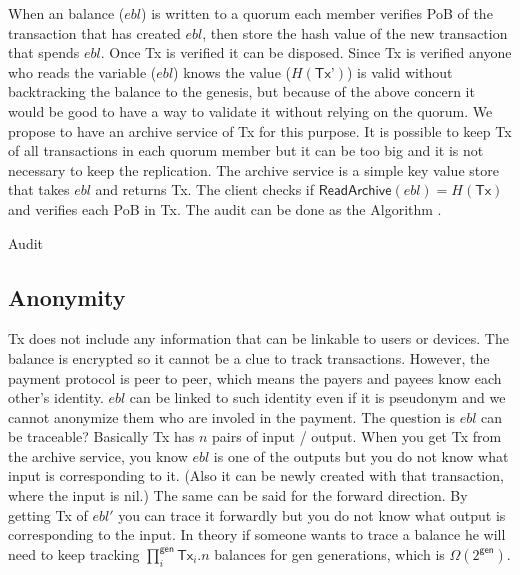 \documentclass[10pt,fleqn]{article}
\begin{document}
When an balance ($ebl$) is written to a quorum each member verifies \textsf{PoB} of the transaction that has created $ebl$, then store the hash value of the new transaction that spends $ebl$. Once \textsf{Tx} is verified it can be disposed. Since \textsf{Tx} is verified anyone who reads the variable ($ebl$) knows the value ($H(\textsf{Tx'})$) is valid without backtracking the balance to the genesis, but because of the above concern it would be good to have a way to validate it without relying on the quorum. We propose to have an archive service of \textsf{Tx} for this purpose. It is possible to keep \textsf{Tx} of all transactions in each quorum member but it can be too big and it is not necessary to keep the replication. The archive service is a simple key value store that takes $ebl$ and returns \textsf{Tx}. The client checks if $\textsf{ReadArchive}(ebl) = H(\textsf{Tx})$ and verifies each \textsf{PoB} in \textsf{Tx}.
The audit can be done as the Algorithm .

\begin{algorithm}[h]
\label{AuditAlgo}
\caption{Audit}
 {
   {
     {
      \Continue
    }
     {
    }
     {
    }
  }
}
\end{algorithm}

\subsection{Anonymity}
\textsf{Tx} does not include any information that can be linkable to users or devices. The balance is encrypted so it cannot be a clue to track transactions. However, the payment protocol is peer to peer, which means the payers and payees know each other's identity. $ebl$ can be linked to such identity even if it is pseudonym and we cannot anonymize them who are involed in the payment. The question is $ebl$ can be traceable? Basically \textsf{Tx} has $n$ pairs of input / output. When you get \textsf{Tx} from the archive service, you know $ebl$ is one of the \textsf{outputs} but you do not know what input is corresponding to it. (Also it can be newly created with that transaction, where the input is \textsf{nil}.) The same can be said for the forward direction. By getting \textsf{Tx} of $ebl'$ you can trace it forwardly but you do not know what output is corresponding to the input. In theory if someone wants to trace a balance he will need to keep tracking $\prod_i^{\textsf{gen}} \textsf{Tx}_i.n$ balances for \textsf{gen} generations, which is $\Omega(2^{\textsf{gen}})$.
\end{document}
